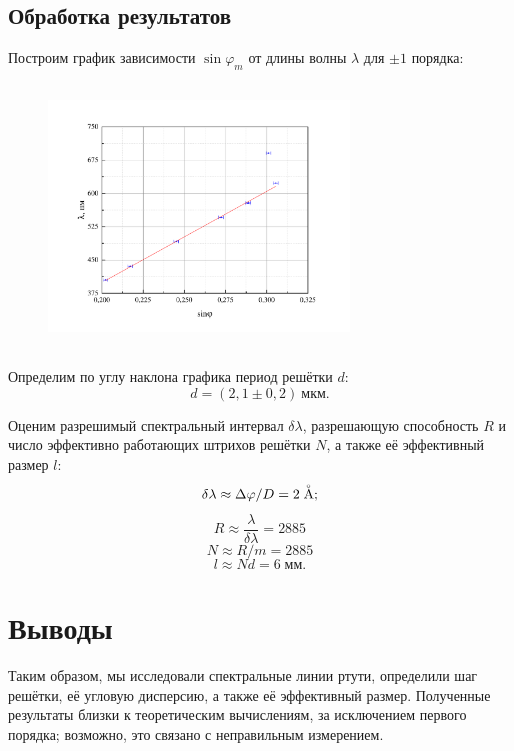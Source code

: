 \documentclass[a4paper,12pt]{article} %
\begin{document}
	\subsection{Обработка результатов}
		Построим график зависимости $\sin \varphi_m$ от длины волны $\lambda$ для $\pm 1$ порядка:
		\begin{figure}[h!]
			\begin{floatrow}
				{\includegraphics[width=8cm,height=7cm]{graph1}}    
			\end{floatrow}
		\end{figure}
	
		Определим по углу наклона графика период решётки $d$:
		\begin{equation}
			d = (2,1\pm 0,2) \ \text{мкм}.
		\end{equation}
	
		Оценим разрешимый спектральный интервал $ \delta\lambda $, разрешающую способность $ R $ и число эффективно работающих штрихов решётки $ N $, а также её эффективный размер $ l $:
		\begin{equation}
			\delta\lambda \approx \Delta\varphi/D = 2 \buildrel _{\circ} \over {\mathrm{A}};
		\end{equation}
		\begin{equation}
			R \approx \frac{\lambda}{\delta\lambda} = 2885
		\end{equation}
		\begin{equation}
			N \approx R/m = 2885
		\end{equation}
		\begin{equation}
			l \approx Nd = 6\; \text{мм.}
		\end{equation}
		
\section{Выводы}
	Таким образом, мы исследовали спектральные линии ртути, определили шаг решётки, её угловую дисперсию, а также её эффективный размер. Полученные результаты близки к теоретическим вычислениям, за исключением первого порядка; возможно, это связано с неправильным измерением.
\end{document}
